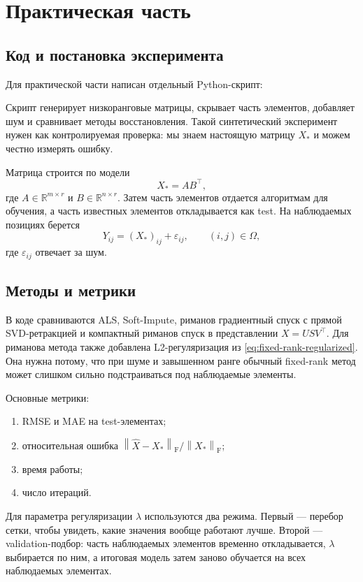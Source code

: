 \documentclass[a4paper,12pt]{article}
\newcommand{\R}{\mathbb{R}}
\newcommand{\fro}[1]{\left\lVert #1 \right\rVert_{\mathrm F}}
\begin{document}
\section{Практическая часть}
\label{sec:empirical}

\subsection{Код и постановка эксперимента}

Для практической части написан отдельный Python-скрипт:
\begin{center}
\end{center}
Скрипт генерирует низкоранговые матрицы, скрывает часть элементов, добавляет шум и сравнивает методы восстановления. Такой синтетический эксперимент нужен как контролируемая проверка: мы знаем настоящую матрицу $X_*$ и можем честно измерять ошибку.

Матрица строится по модели
\[
X_* = AB^\top,
\]
где $A\in\R^{m\times r}$ и $B\in\R^{n\times r}$. Затем часть элементов отдается алгоритмам для обучения, а часть известных элементов откладывается как test. На наблюдаемых позициях берется
\[
Y_{ij}=(X_*)_{ij}+\varepsilon_{ij}, \qquad (i,j)\in\Omega,
\]
где $\varepsilon_{ij}$ отвечает за шум.

\subsection{Методы и метрики}

В коде сравниваются ALS, Soft-Impute, риманов градиентный спуск с прямой SVD-ретракцией и компактный риманов спуск в представлении $X=USV^\top$. Для риманова метода также добавлена L2-регуляризация из \eqref{eq:fixed-rank-regularized}. Она нужна потому, что при шуме и завышенном ранге обычный fixed-rank метод может слишком сильно подстраиваться под наблюдаемые элементы.

Основные метрики:
\begin{enumerate}[label=\arabic*.]
    \item RMSE и MAE на test-элементах;
    \item относительная ошибка $\fro{\widehat X-X_*}/\fro{X_*}$;
    \item время работы;
    \item число итераций.
\end{enumerate}

Для параметра регуляризации $\lambda$ используются два режима. Первый --- перебор сетки, чтобы увидеть, какие значения вообще работают лучше. Второй --- validation-подбор: часть наблюдаемых элементов временно откладывается, $\lambda$ выбирается по ним, а итоговая модель затем заново обучается на всех наблюдаемых элементах.
\end{document}
